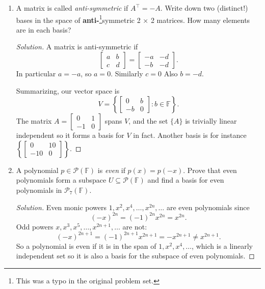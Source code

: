 \documentclass[a4paper,11pt]{article}
\theoremstyle{definition}
\newtheorem{remark}[theorem]{Remark}
\newenvironment{solution}
  {\renewcommand\qedsymbol{$\blacksquare$}\begin{proof}[Solution]}
  {\end{proof}}
\begin{document}
\begin{enumerate}[(1)]
\begin{solution}
\begin{enumerate}[(a)]
\begin{remark}The matrices $\sigma_x$, $\sigma_y$ and $\sigma_z$ are called \textit{Pauli matrices} and are fundamental in quantum mechanics.\end{remark}
\end{enumerate}
\end{solution}

\item 
A matrix is called \textit{anti-symmetric} if $A^\intercal = -A$.
Write down two (distinct!) bases in the
space of \textbf{anti-}\footnote{This was a typo in the original problem set.}symmetric 2 × 2 matrices.
How many elements are in each basis?
\begin{solution}
A matrix is anti-symmetric if
\[
\begin{bmatrix}
    a & b \\ c & d
\end{bmatrix}
=
\begin{bmatrix}
    -a & -d \\ -b & -d
\end{bmatrix}.
\]
In particular $a=-a$, so $a=0$.
Similarly $c=0$
Also $b=-d$.

Summarizing, our vector space is
\[V=\left\{
\begin{bmatrix}
    0& b \\ -b & 0
\end{bmatrix}
:
b\in\mathbb F\right\}.
\]
The matrix $A = \begin{bmatrix}
    0& 1 \\ -1 & 0
\end{bmatrix}$ spans $V$, and the set $\{A\}$ is trivially linear independent so it forms a basis for $V$ in fact.
Another basis is for instance $\left\{\begin{bmatrix}
    0& 10 \\ -10 & 0
\end{bmatrix}\right\}$.
\end{solution}

\item 
A polynomial $p\in\mathcal P(\mathbb F)$ is \textit{even} if $p(x) = p(-x)$.
Prove that even polynomials form a subspace $U\subseteq \mathcal P(\mathbb F)$ and find a basis for even polynomials in $\mathcal P_7(\mathbb F)$.
\begin{solution}
Even monic powers $1, x^2,x^4,\dots,x^{2n},\dots$ are even polynomials since
\[
(-x)^{2n} = (-1)^{2n}x^{2n} = x^{2n}.
\]
Odd powers $x,x^3,x^5,\dots,x^{2n+1},\dots$ are not:
\[
(-x)^{2n+1} = (-1)^{2n+1}x^{2n+1} = -x^{2n+1}\neq x^{2n+1}.
\]
So a polynomial is even if it is in the span of $1,x^2,x^4,\dots$, which is a linearly independent set so it is also a basis for the subspace of even polynomials.


\end{solution}
\end{enumerate}
\end{document}
